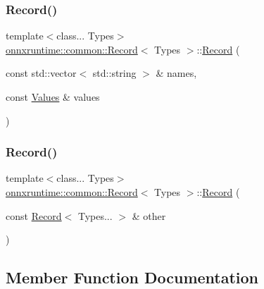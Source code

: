 \subsubsection{\texorpdfstring{Record()}{Record()}\hspace{0.1cm}{\footnotesize\ttfamily [2/3]}}
{\footnotesize\ttfamily template$<$class... Types$>$ \\
\mbox{\hyperlink{classonnxruntime_1_1common_1_1Record}{onnxruntime\+::common\+::\+Record}}$<$ Types $>$\+::\mbox{\hyperlink{classonnxruntime_1_1common_1_1Record}{Record}} (\begin{DoxyParamCaption}\item[{const std\+::vector$<$ std\+::string $>$ \&}]{names,  }\item[{const \mbox{\hyperlink{classonnxruntime_1_1common_1_1Record_adf21ddd0ae1bfd54963165bde0b417d7}{Values}} \&}]{values }\end{DoxyParamCaption})\hspace{0.3cm}{\ttfamily [inline]}}

\mbox{\label{classonnxruntime_1_1common_1_1Record_a3639716e0101db2c3bb0dc821f26dd0c}} 
\subsubsection{\texorpdfstring{Record()}{Record()}\hspace{0.1cm}{\footnotesize\ttfamily [3/3]}}
{\footnotesize\ttfamily template$<$class... Types$>$ \\
\mbox{\hyperlink{classonnxruntime_1_1common_1_1Record}{onnxruntime\+::common\+::\+Record}}$<$ Types $>$\+::\mbox{\hyperlink{classonnxruntime_1_1common_1_1Record}{Record}} (\begin{DoxyParamCaption}\item[{const \mbox{\hyperlink{classonnxruntime_1_1common_1_1Record}{Record}}$<$ Types... $>$ \&}]{other }\end{DoxyParamCaption})\hspace{0.3cm}{\ttfamily [inline]}}



\subsection{Member Function Documentation}
\mbox{\label{classonnxruntime_1_1common_1_1Record_aa90ebb80f43a3ed7f626a39c8f139812}} 

